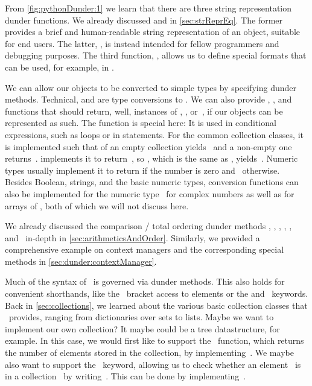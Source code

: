 From \cref{fig:pythonDunder:1} we learn that there are three string representation dunder functions.
We already discussed  and  in \cref{sec:strReprEq}.
The former provides a brief and human-readable string representation of an object, suitable for end users.
The latter, , is instead intended for fellow programmers and debugging purposes.
The third function, , allows us to define special formats that can be used, for example, in .

We can allow our objects to be converted to simple types by specifying dunder methods.
Technical,  and  are type conversions to .
We can also provide , , and  functions that should return, well, instances of , , or~, if our objects can be represented as such.
The  function is special here:
It is used in conditional expressions, such as  loops or in  statements.
For the common collection classes, it is implemented such that  of an empty collection yields~ and a non-empty one returns~.
 implements it to return~, so , which is the same as , yields~.
Numeric types usually implement it to return  if the number is zero and~ otherwise.
Besides Boolean, strings, and the basic numeric types, conversion functions can also be implemented for the numeric type~ for complex numbers as well as for arrays of , both of which we will not discuss here.

We already discussed the comparison / total ordering dunder methods , , , , , and~ in-depth in \cref{sec:arithmeticsAndOrder}.
Similarly, we provided a comprehensive example on context managers and the corresponding special methods in \cref{sec:dunder:contextManager}.

Much of the syntax of \python\ is governed via dunder methods.
This also holds for convenient shorthands, like the \pythonil{[...]}\pythonIdx{[\idxdots]}~bracket access to elements or the  and ~keywords.
Back in \cref{sec:collections}, we learned about the various basic collection classes that \python\ provides, ranging from dictionaries over sets to lists.
Maybe we want to implement our own collection?
It maybe could be a tree datastructure, for example.
In this case, we would first like to support the ~function, which returns the number of elements stored in the collection, by implementing~.
We maybe also want to support the ~keyword, allowing us to check whether an element~ is in a collection~ by writing~.
This can be done by implementing~.

